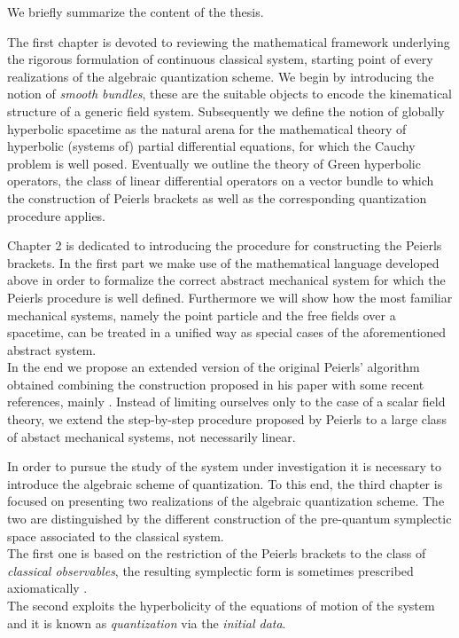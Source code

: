 \documentclass[Main]{subfiles}
\begin{document}
\vspace{3mm}
We briefly summarize the content of the thesis.

The first chapter is devoted to reviewing the mathematical framework  underlying the rigorous formulation of continuous classical system, starting point of every realizations of the algebraic quantization scheme.
We begin by introducing the notion of \emph{smooth bundles}, these are the suitable objects to encode the kinematical structure of a generic field system.
Subsequently we define the notion of globally hyperbolic spacetime as  the natural arena for the mathematical theory of hyperbolic (systems of) partial differential equations, for which the Cauchy problem is well posed.
Eventually we outline the theory of Green hyperbolic operators, the class of linear differential operators on a vector bundle to which the construction of Peierls brackets as well as the corresponding quantization procedure applies.

Chapter 2 is dedicated to introducing the procedure for constructing the Peierls brackets.
In the first part we make use of the mathematical language developed above in order to formalize the correct abstract mechanical system for which the Peierls procedure is well defined. Furthermore we will show how the most familiar mechanical systems, namely the point particle and the free fields over a spacetime, can be treated in a unified way as special cases of the aforementioned abstract system.
\\
In the end we propose an extended version of the original Peierls' algorithm obtained combining the construction proposed in his paper\cite{Peierls1952} with some recent references, mainly \cite{Marolf1993}\cite{Dewitt1999}\cite{Forger2005}\cite{Sharan2010}\cite{Khavkine2014}.
Instead of limiting ourselves only to the case of a scalar field theory, we extend the step-by-step procedure proposed by Peierls to a large class of abstact mechanical systems, not necessarily linear.

In order to pursue the study of the system under investigation it is necessary to introduce the algebraic scheme of quantization.
To this end, the third chapter is focused on presenting two realizations of the algebraic quantization scheme.
The two are distinguished by the different construction of the pre-quantum symplectic space associated to the classical system.
\\
The first one is based on the restriction of the Peierls brackets to the class of \emph{classical observables}, the resulting symplectic form is sometimes prescribed axiomatically \cite{Dewitt1999}\cite{Esposito}\cite{Benini}.\\
The second exploits the hyperbolicity of the equations of motion of the system and it is known as \emph{quantization} via the \emph{initial data}\cite{Wald1994}.
\end{document}
